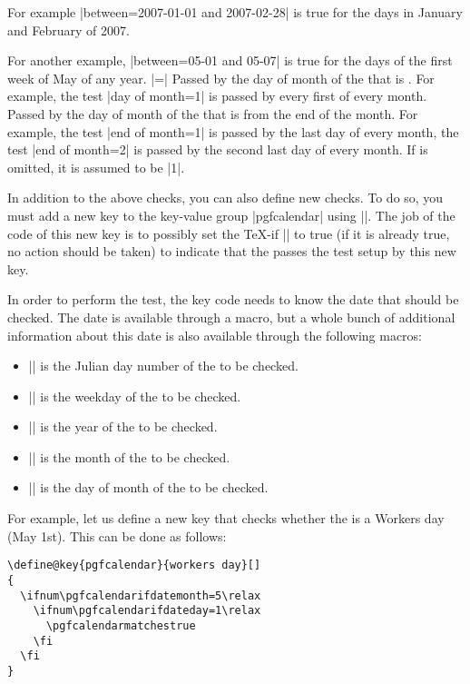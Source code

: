 \begin{command}{\pgfcalendarifdate{}}
\begin{itemize}
  For example |between=2007-01-01 and 2007-02-28| is true for the days
  in January and February of 2007.

  For another example, |between=05-01 and 05-07| is true for the
  days of the first week of May of any year.
  |=| Passed by the day
  of month of the  that is . For example, the test
  |day of month=1| is passed by every first of every month.
   Passed by
  the day of month of the  that is  from the
  end of the month. For example, the test |end of month=1| is passed
  by the last day of every month, the test |end of month=2| is passed
  by the second last day of every month. If  is omitted,
  it is assumed to be |1|.
  \end{itemize}

  In addition to the above checks, you can also define new checks. To
  do so, you must add a new key to the key-value group |pgfcalendar|
  using ||. The job of the code of this new key is to
  possibly set the \TeX-if |\ifpgfcalendarmatches| to true (if it is
  already true, no action should be taken) to indicate that the
   passes the test setup by this new key.

  In order to perform the test, the key code needs to know the date
  that should be checked. The date is available through a macro, but a
  whole bunch of additional information about this date is also
  available through the following macros:
  \begin{itemize}
  \item |\pgfcalendarifdatejulian|
    is the Julian day number of the  to be checked.
  \item |\pgfcalendarifdateweekday|
    is the weekday of the  to be checked.
  \item |\pgfcalendarifdateyear|
    is the year of the  to be checked.
  \item |\pgfcalendarifdatemonth|
    is the month of the  to be checked.
  \item |\pgfcalendarifdateday|
    is the day of month of the  to be checked.
  \end{itemize}

  For example, let us define a new key that checks whether the
   is a Workers day (May 1st). This can be done as
  follows:
\begin{verbatim}
\define@key{pgfcalendar}{workers day}[]
{
  \ifnum\pgfcalendarifdatemonth=5\relax
    \ifnum\pgfcalendarifdateday=1\relax
      \pgfcalendarmatchestrue
    \fi
  \fi
}
\end{verbatim}
\end{command}


